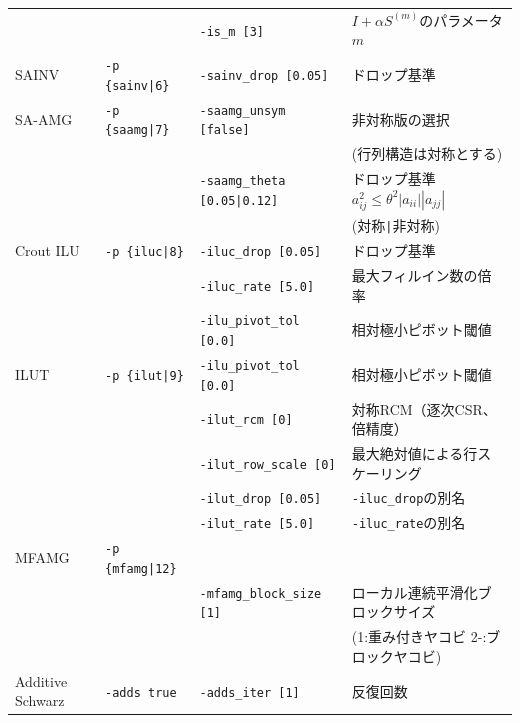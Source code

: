 \documentclass[a4paper]{jarticle}
\begin{document}
{{\begin{minipage}[t]{\textwidth}
\begin{center}
\begin{tabular}{l|lll}
         &                       & \verb=-is_m [3]=        & $I+\alpha S^{(m)}$のパラメータ$m$ \\
SAINV    & \verb=-p {sainv|6}=   & \verb=-sainv_drop [0.05]=    & ドロップ基準\\
SA-AMG   & \verb=-p {saamg|7}=   & \verb=-saamg_unsym [false]=     & 非対称版の選択 \\
         &                       &                                 & (行列構造は対称とする) \\
         &                       & \verb=-saamg_theta [0.05|0.12]= & ドロップ基準 $a^2_{ij}\le\theta^2|a_{ii}||a_{jj}|$ \\
         &                       &                             & (対称\verb=|=非対称) \\
Crout ILU& \verb=-p {iluc|8}=    & \verb=-iluc_drop [0.05]=    & ドロップ基準    \\
         &                       & \verb=-iluc_rate [5.0]=     & 最大フィルイン数の倍率 \\
         &                       & \verb=-ilu_pivot_tol [0.0]= & 相対極小ピボット閾値 \\
ILUT     & \verb=-p {ilut|9}=    & \verb=-ilu_pivot_tol [0.0]= & 相対極小ピボット閾値 \\
         &                       & \verb=-ilut_rcm [0]= & 対称RCM（逐次CSR、倍精度） \\
         &                       & \verb=-ilut_row_scale [0]= & 最大絶対値による行スケーリング \\
         &                       & \verb=-ilut_drop [0.05]= & \verb=-iluc_drop=の別名 \\
         &                       & \verb=-ilut_rate [5.0]= & \verb=-iluc_rate=の別名 \\
MFAMG   & \verb=-p {mfamg|12}=  &                             &                            \\
         &                       & \verb=-mfamg_block_size [1]= & ローカル連続平滑化ブロックサイズ \\
         &                       &                              & (1:重み付きヤコビ 2-:ブロックヤコビ) \\
Additive Schwarz  & \verb=-adds true=   &  \verb=-adds_iter [1]= & 反復回数   \\
\hline         
\end{tabular}
\end{center}
\end{minipage}
\\ \\
}}
\end{document}
